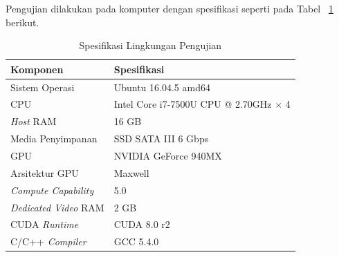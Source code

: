 \documentclass[conference]{IEEEtran}
\begin{document}
        Pengujian dilakukan pada komputer dengan spesifikasi seperti pada Tabel ~\ref{test-spec} berikut.
        
        \begin{table}[htbp]
            \caption {Spesifikasi Lingkungan Pengujian}
            \begin{center}
                \begin{tabular}{|l|l|}
                    \hline
                    \rowcolor{gray!15}
                    \textbf{Komponen} & \textbf{Spesifikasi} \\
                    \hline                    
                    Sistem Operasi & Ubuntu 16.04.5 amd64 \\
                    \hline                    
                    CPU & Intel Core i7-7500U CPU @ 2.70GHz × 4 \\
                    \hline                    
                    \emph{Host} RAM & 16 GB \\
                    \hline                    
                    Media Penyimpanan & SSD SATA III 6 Gbps \\
                    \hline                    
                    GPU & NVIDIA GeForce 940MX \\
                    \hline                    
                    Arsitektur GPU & Maxwell \\
                    \hline                    
                    \emph{Compute Capability} & 5.0 \\
                    \hline                    
                    \emph{Dedicated Video} RAM & 2 GB \\
                    \hline                    
                    CUDA \emph{Runtime} & CUDA 8.0 r2 \\
                    \hline                    
                    C/C++ \emph{Compiler} & GCC 5.4.0 \\
                    \hline                    
                    \end{tabular}
            \label{test-spec}
            \end{center}
        \end{table}
\end{document}

